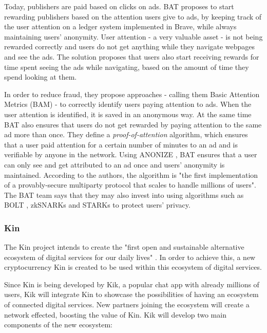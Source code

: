 \medskip

Today, publishers are paid based on clicks on ads. BAT proposes to start rewarding publishers based on the attention users give to ads, by keeping track of the user attention on a ledger system implemented in Brave, while always maintaining users' anonymity. User attention - a very valuable asset - is not being rewarded correctly and users do not get anything while they navigate webpages and see the ads. The solution proposes that users also start receiving rewards for time spent seeing the ads while navigating, based on the amount of time they spend looking at them.

\medskip

In order to reduce fraud, they propose approaches - calling them Basic Attention Metrics (BAM) - to correctly identify users paying attention to ads. When the user attention is identified, it is saved in an anonymous way. At the same time BAT also ensures that users do not get rewarded by paying attention to the same ad more than once. They define a \textit{proof-of-attention} algorithm, which ensures that a user paid attention for a certain number of minutes to an ad and is verifiable by anyone in the network. Using \textsf{ANONIZE} \cite{ANONIZE}, BAT ensures that a user can only see and get attributed to an ad once and users' anonymity is maintained. According to the authors, the algorithm is "the first implementation of a provably-secure multiparty protocol that scales to handle millions of users".  The BAT team says that they may also invest into using algorithms such as BOLT \cite{Bolt}, zkSNARKs \cite{ZKSNARK} and STARKs \cite{STARK} to protect users' privacy.

\subsubsection{Kin}

The Kin project intends to create the "first open and sustainable alternative ecosystem of digital services for our daily lives" \cite{KIN}. In order to achieve this, a new cryptocurrency Kin is created to be used within this ecosystem of digital services.

\medskip

Since Kin is being developed by Kik, a popular chat app with already millions of users, Kik will integrate Kin to showcase the possibilities of having an ecosystem of connected digital services. New partners joining the ecosystem will create a network effected, boosting the value of Kin. Kik will develop two main components of the new ecosystem:

